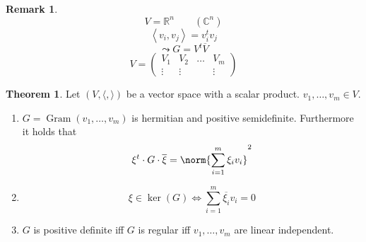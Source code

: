 \documentclass[a4paper,landscape,twocolumn]{article}
\newcommand\functional[1]{\left\langle{#1}\right\rangle}
\theoremstyle{definition}
\newtheorem{theorem}{Theorem}
\newtheorem{rem}{Remark}
\DeclareMathOperator\kernel{ker} %
\DeclarePairedDelimiter\norm\lVert\rVert
\begin{document}
\begin{rem}
  \[ V = \mathbb R^n \qquad (\mathbb C^n) \]
  \[ \functional{v_i, v_j} = v_i^t v_j \]
  \[ \leadsto G = V^t \overline{V} \]
  \[
    V = \begin{pmatrix}
      V_1 & V_2 & \ldots & V_m \\
      \vdots & \vdots &  & \vdots
    \end{pmatrix}
  \]
\end{rem}

\begin{theorem}
  \label{satz-8.53}
  Let $(V, \langle, \rangle)$ be a vector space with a scalar product.
  $v_1, \ldots, v_m \in V$.
  \begin{enumerate}
    \item
      $G = \operatorname{Gram}(v_1, \ldots, v_m)$ is hermitian and positive semidefinite.
      Furthermore it holds that
      \[ \xi^t \cdot G \cdot \overline{\xi} = \norm{\sum_{i=1}^m \xi_i v_i}^2 \]
    \item
      \[ \xi \in \kernel(G) \Leftrightarrow \sum_{i=1}^m \overline{\xi_i} v_i = 0 \]
    \item
      $G$ is positive definite iff $G$ is regular iff $v_1, \ldots, v_m$ are linear independent.
  \end{enumerate}
\end{theorem}
\end{document}
